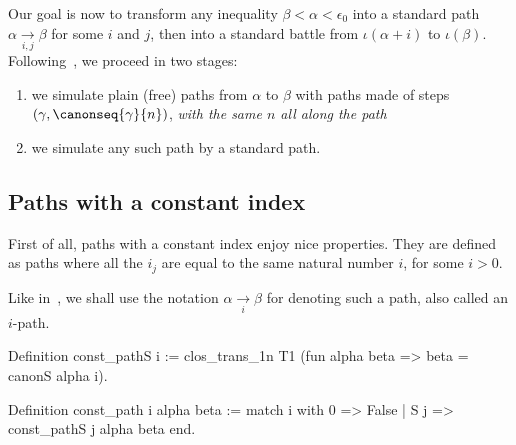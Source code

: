 Our goal is now  to transform any inequality $\beta<\alpha<\epsilon_0$ into a standard path $\alpha \xrightarrow[i,j]{} \beta$ for some $i$ and $j$, then into a standard battle
from $\iota(\alpha+i)$ to $\iota(\beta)$. 
Following~\cite{KS81}, we proceed in two stages:
\begin{enumerate}
\item we simulate plain (free) paths from $\alpha$ to $\beta$ with
paths made of steps $(\gamma,\canonseq{\gamma}{n})$, \emph{with the same $n$ all along the path}
\item we simulate any such path by a standard path.
\end{enumerate}



\subsection{Paths with a constant index}

First of all, paths with a constant index 
enjoy nice properties. They are defined as paths where all the $i_j$ are equal to the same natural number $i$, for some $i>0$. 


Like in~\cite{KS81}, we shall use the notation $\alpha \xrightarrow[i]{} \beta$ for denoting such a path, also called an $i$-path.

\begin{Coqsrc}
Definition const_pathS i :=
    clos_trans_1n T1 (fun alpha beta => beta = canonS alpha i).

Definition const_path i alpha beta :=
  match i with
    0 => False
  | S j => const_pathS j alpha beta
end.
\end{Coqsrc}





